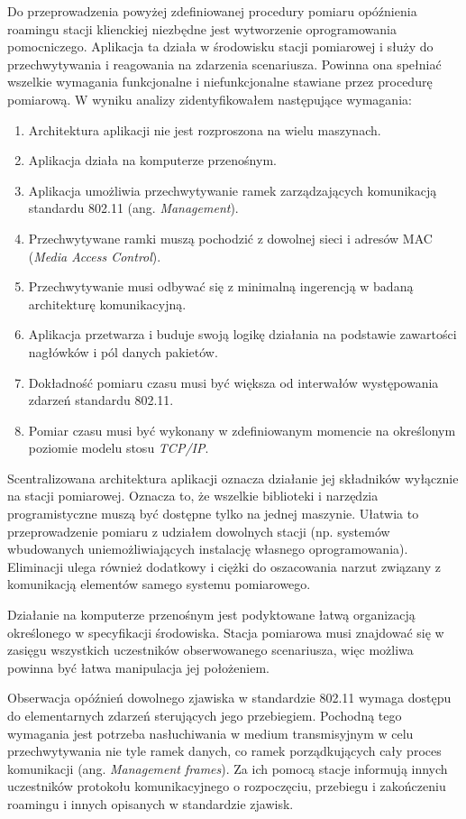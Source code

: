 Do przeprowadzenia powyżej zdefiniowanej procedury pomiaru opóźnienia roamingu stacji klienckiej niezbędne jest wytworzenie oprogramowania pomocniczego. Aplikacja ta działa w środowisku stacji pomiarowej i służy do przechwytywania i reagowania na zdarzenia scenariusza. Powinna ona spełniać wszelkie wymagania funkcjonalne i niefunkcjonalne stawiane przez procedurę pomiarową. W wyniku analizy zidentyfikowałem następujące wymagania: 
\begin{enumerate}
\item Architektura aplikacji nie jest rozproszona na wielu maszynach.
\item Aplikacja działa na komputerze przenośnym.
\item Aplikacja umożliwia przechwytywanie ramek zarządzających komunikacją standardu 802.11 (ang. \emph{Management}). 
\item Przechwytywane ramki muszą pochodzić z dowolnej sieci i adresów MAC (\emph{Media Access Control}).
\item Przechwytywanie musi odbywać się z minimalną ingerencją w badaną architekturę komunikacyjną.
\item Aplikacja przetwarza i buduje swoją logikę działania na podstawie zawartości nagłówków i pól danych pakietów. 
\item Dokładność pomiaru czasu musi być większa od interwałów występowania zdarzeń standardu 802.11.
\item Pomiar czasu musi być wykonany w zdefiniowanym momencie na określonym poziomie modelu stosu \emph{TCP/IP}.
\end{enumerate}

Scentralizowana architektura aplikacji oznacza działanie jej składników wyłącznie na stacji pomiarowej. Oznacza to, że wszelkie biblioteki i narzędzia programistyczne muszą być dostępne tylko na jednej maszynie. Ułatwia to przeprowadzenie pomiaru z udziałem dowolnych stacji (np. systemów wbudowanych uniemożliwiających instalację własnego oprogramowania). Eliminacji ulega również dodatkowy i ciężki do oszacowania narzut związany z komunikacją elementów samego systemu pomiarowego.

Działanie na komputerze przenośnym jest podyktowane łatwą organizacją określonego w specyfikacji środowiska. Stacja pomiarowa musi znajdować się w zasięgu wszystkich uczestników obserwowanego scenariusza, więc możliwa powinna być łatwa manipulacja jej położeniem.

Obserwacja opóźnień dowolnego zjawiska w standardzie 802.11 wymaga dostępu do elementarnych zdarzeń sterujących jego przebiegiem. Pochodną tego wymagania jest potrzeba nasłuchiwania w medium transmisyjnym w celu przechwytywania nie tyle ramek danych, co ramek porządkujących cały proces komunikacji (ang. \emph{Management frames}). Za ich pomocą stacje informują innych uczestników protokołu komunikacyjnego o rozpoczęciu, przebiegu i zakończeniu roamingu i innych opisanych w standardzie zjawisk. 

